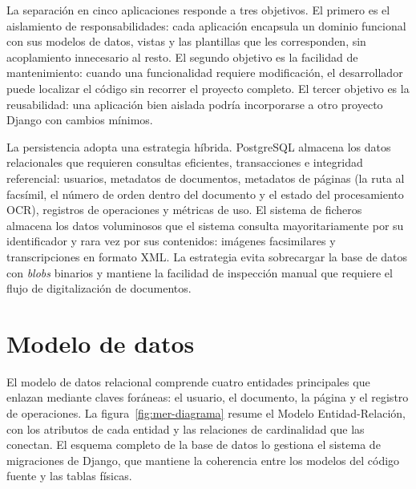 La separación en cinco aplicaciones responde a tres objetivos. El primero es el aislamiento de responsabilidades: cada aplicación encapsula un dominio funcional con sus modelos de datos, vistas y las plantillas que les corresponden, sin acoplamiento innecesario al resto. El segundo objetivo es la facilidad de mantenimiento: cuando una funcionalidad requiere modificación, el desarrollador puede localizar el código sin recorrer el proyecto completo. El tercer objetivo es la reusabilidad: una aplicación bien aislada podría incorporarse a otro proyecto Django con cambios mínimos.

La persistencia adopta una estrategia híbrida. PostgreSQL almacena los datos relacionales que requieren consultas eficientes, transacciones e integridad referencial: usuarios, metadatos de documentos, metadatos de páginas (la ruta al facsímil, el número de orden dentro del documento y el estado del procesamiento OCR), registros de operaciones y métricas de uso. El sistema de ficheros almacena los datos voluminosos que el sistema consulta mayoritariamente por su identificador y rara vez por sus contenidos: imágenes facsimilares y transcripciones en formato XML. La estrategia evita sobrecargar la base de datos con \textit{blobs} binarios y mantiene la facilidad de inspección manual que requiere el flujo de digitalización de documentos.

\section{Modelo de datos}
\label{sec:modelo-datos}

El modelo de datos relacional comprende cuatro entidades principales que enlazan mediante claves foráneas: el usuario, el documento, la página y el registro de operaciones. La figura~\ref{fig:mer-diagrama} resume el Modelo Entidad-Relación, con los atributos de cada entidad y las relaciones de cardinalidad que las conectan. El esquema completo de la base de datos lo gestiona el sistema de migraciones de Django, que mantiene la coherencia entre los modelos del código fuente y las tablas físicas.

